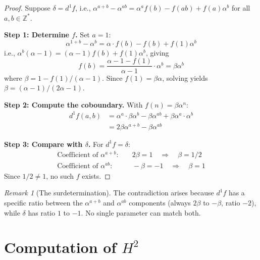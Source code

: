\documentclass[11pt,a4paper]{article}
\theoremstyle{plain}
\theoremstyle{definition}
\theoremstyle{remark}
\newtheorem{remark}[theorem]{Remark}
\newcommand{\ZZ}{\mathbb{Z}}
\begin{document}
\begin{proof}
Suppose $\delta = d^1 f$, i.e., 
$\alpha^{a+b} - \alpha^{ab} = \alpha^a f(b) - f(ab) + f(a)\alpha^b$ 
for all $a, b \in \ZZ^*$.

\textbf{Step 1: Determine $f$.} Set $a = 1$:
\begin{equation*}
\alpha^{1+b} - \alpha^b = \alpha \cdot f(b) - f(b) + f(1)\alpha^b
\end{equation*}
i.e., $\alpha^b(\alpha - 1) = (\alpha - 1)f(b) + f(1)\alpha^b$, 
giving
\begin{equation}
f(b) = \frac{\alpha - 1 - f(1)}{\alpha - 1} \cdot \alpha^b = 
\beta \alpha^b
\label{eq:f-form}
\end{equation}
where $\beta = 1 - f(1)/(\alpha - 1)$. Since $f(1) = \beta\alpha$, 
solving yields $\beta = (\alpha - 1)/(2\alpha - 1)$.

\textbf{Step 2: Compute the coboundary.} With $f(n) = \beta\alpha^n$:
\begin{align*}
d^1 f(a,b) &= \alpha^a \cdot \beta\alpha^b - \beta\alpha^{ab} + 
\beta\alpha^a \cdot \alpha^b \\
&= 2\beta\alpha^{a+b} - \beta\alpha^{ab}
\end{align*}

\textbf{Step 3: Compare with $\delta$.} For $d^1 f = \delta$:
\begin{align*}
\text{Coefficient of } \alpha^{a+b}: &\quad 2\beta = 1 
\quad\Rightarrow\quad \beta = 1/2 \\
\text{Coefficient of } \alpha^{ab}: &\quad -\beta = -1 
\quad\Rightarrow\quad \beta = 1
\end{align*}
Since $1/2 \neq 1$, no such $f$ exists.
\end{proof}

\begin{remark}[The surdetermination]
\label{rem:surdetermination}
The contradiction arises because $d^1 f$ has a specific ratio between 
the $\alpha^{a+b}$ and $\alpha^{ab}$ components (always $2\beta$ to 
$-\beta$, ratio $-2$), while $\delta$ has ratio $1$ to $-1$. No 
single parameter can match both.
\end{remark}

\section{Computation of $H^2$}
\label{sec:H2}
\end{document}
